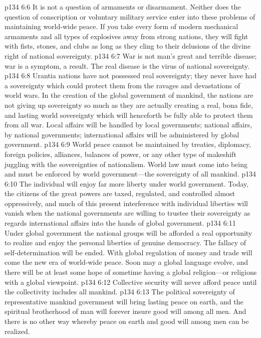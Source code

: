 \vs p134 6:6 It is not a question of armaments or disarmament. Neither does the question of conscription or voluntary military service enter into these problems of maintaining world\hyp{}wide peace. If you take every form of modern mechanical armaments and all types of explosives away from strong nations, they will fight with fists, stones, and clubs as long as they cling to their delusions of the divine right of national sovereignty.
\vs p134 6:7 War is not man’s great and terrible disease; war is a symptom, a result. The real disease is the virus of national sovereignty.
\vs p134 6:8 Urantia nations have not possessed real sovereignty; they never have had a sovereignty which could protect them from the ravages and devastations of world wars. In the creation of the global government of mankind, the nations are not giving up sovereignty so much as they are actually creating a real, bona fide, and lasting world sovereignty which will henceforth be fully able to protect them from all war. Local affairs will be handled by local governments; national affairs, by national governments; international affairs will be administered by global government.
\vs p134 6:9 World peace cannot be maintained by treaties, diplomacy, foreign policies, alliances, balances of power, or any other type of makeshift juggling with the sovereignties of nationalism. World law must come into being and must be enforced by world government---the sovereignty of all mankind.
\vs p134 6:10 The individual will enjoy far more liberty under world government. Today, the citizens of the great powers are taxed, regulated, and controlled almost oppressively, and much of this present interference with individual liberties will vanish when the national governments are willing to trustee their sovereignty as regards international affairs into the hands of global government.
\vs p134 6:11 Under global government the national groups will be afforded a real opportunity to realize and enjoy the personal liberties of genuine democracy. The fallacy of self\hyp{}determination will be ended. With global regulation of money and trade will come the new era of world\hyp{}wide peace. Soon may a global language evolve, and there will be at least some hope of sometime having a global religion---or religions with a global viewpoint.
\vs p134 6:12 Collective security will never afford peace until the collectivity includes all mankind.
\vs p134 6:13 The political sovereignty of representative mankind government will bring lasting peace on earth, and the spiritual brotherhood of man will forever insure good will among all men. And there is no other way whereby peace on earth and good will among men can be realized.
